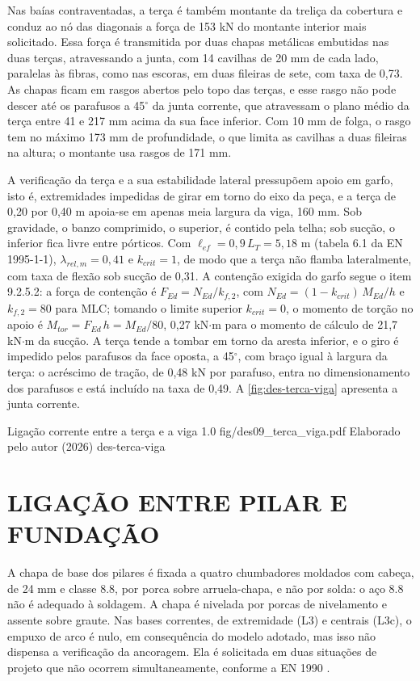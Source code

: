 Nas baías contraventadas, a terça é também montante da treliça da cobertura e
conduz ao nó das diagonais a força de 153 kN do montante interior mais
solicitado. Essa força é transmitida por duas chapas metálicas embutidas nas duas
terças, atravessando a junta, com 14 cavilhas de 20 mm de cada lado, paralelas
às fibras, como nas escoras, em duas fileiras de sete, com taxa de 0,73. As chapas
ficam em rasgos abertos pelo topo das terças, e esse rasgo não pode descer até os
parafusos a 45$^{\circ}$ da junta corrente, que atravessam o plano médio da terça
entre 41 e 217 mm acima da sua face inferior. Com 10 mm de folga, o rasgo tem no
máximo 173 mm de profundidade, o que limita as cavilhas a duas fileiras na
altura; o montante usa rasgos de 171 mm.

A verificação da terça e a sua estabilidade lateral pressupõem apoio em garfo,
isto é, extremidades impedidas de girar em torno do eixo da peça, e a terça de
0,20 por 0,40 m apoia-se em apenas meia largura da viga, 160 mm. Sob gravidade, o
banzo comprimido, o superior, é contido pela telha; sob sucção, o inferior fica
livre entre pórticos. Com $\ell_{ef} = 0{,}9\,L_T = 5{,}18$ m (tabela 6.1 da
EN 1995-1-1), $\lambda_{rel,m} = 0{,}41$ e $k_{crit} = 1$, de modo que a terça não
flamba lateralmente, com taxa de flexão sob sucção de 0,31. A contenção exigida
do garfo segue o item 9.2.5.2: a força de contenção é $F_{Ed} = N_{Ed}/k_{f,2}$, com
$N_{Ed} = (1 - k_{crit})\,M_{Ed}/h$ e $k_{f,2} = 80$ para MLC; tomando o limite superior
$k_{crit} = 0$, o momento de torção no apoio é $M_{tor} = F_{Ed}\,h = M_{Ed}/80$,
0,27 kN$\cdot$m para o momento de cálculo de 21,7 kN$\cdot$m da sucção. A terça
tende a tombar em torno da aresta inferior, e o giro é impedido pelos parafusos
da face oposta, a 45$^{\circ}$, com braço igual à largura da terça: o acréscimo de
tração, de 0,48 kN por parafuso, entra no dimensionamento dos parafusos e está
incluído na taxa de 0,49. A \autoref{fig:des-terca-viga} apresenta a junta corrente.

\figura
{Ligação corrente entre a terça e a viga}
{1.0}
{fig/des09_terca_viga.pdf}
{Elaborado pelo autor (2026)}
{des-terca-viga}
{}
{}

\section{LIGAÇÃO ENTRE PILAR E FUNDAÇÃO}\label{sec:ligacao-base}

A chapa de base dos pilares é fixada a quatro chumbadores moldados com cabeça, de
24 mm e classe 8.8, por porca sobre arruela-chapa, e não por solda: o aço 8.8 não
é adequado à soldagem. A chapa é nivelada por porcas de nivelamento e assente
sobre graute. Nas bases correntes, de extremidade (L3) e
centrais (L3c), o empuxo de arco é nulo, em consequência do modelo adotado, mas
isso não dispensa a verificação da ancoragem. Ela é solicitada em duas
situações de projeto que não ocorrem simultaneamente, conforme a EN 1990
\cite{EN1990:2002}.

